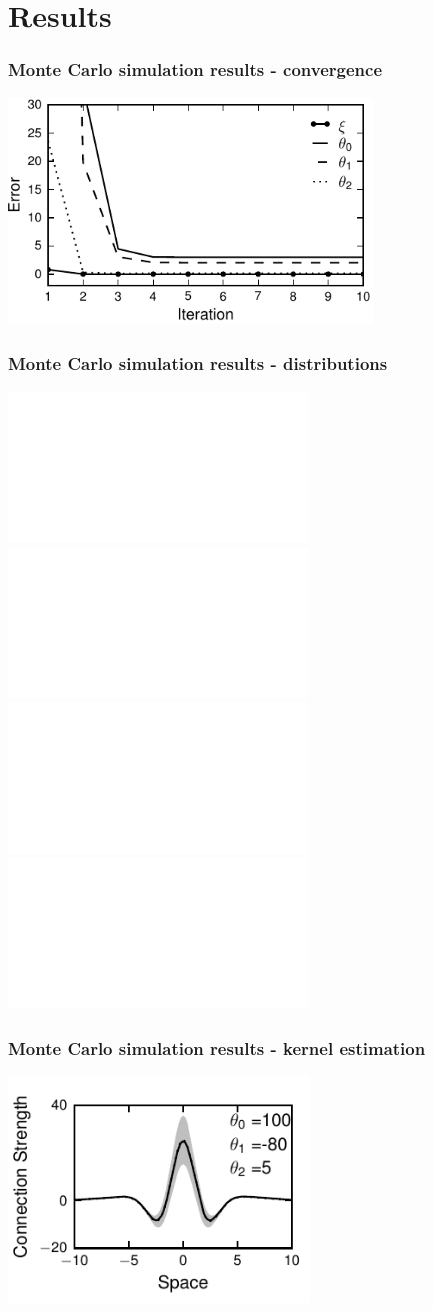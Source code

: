 \documentclass[compress]{beamer}
\begin{document}
\section[Results]{Results}
\begin{frame}\frametitle{Monte Carlo simulation results - convergence}
	\begin{center}
		\includegraphics[height=6cm]{./Figures/fig6.pdf}
	\end{center}
\end{frame}

\begin{frame}\frametitle{Monte Carlo simulation results - distributions}
	\begin{center}
		\includegraphics<1>[height=4cm]{./Figures/Figure7a.pdf}
		\includegraphics<1>[height=4cm]{./Figures/Figure7b.pdf}\\
		\includegraphics<1>[height=4cm]{./Figures/Figure7c.pdf}
		\includegraphics<1>[height=4cm]{./Figures/Figure7d.pdf}
	\end{center}	
\end{frame}

\begin{frame}\frametitle{Monte Carlo simulation results - kernel estimation}
	\begin{center}
		\includegraphics[height=6cm]{./Figures/Figure10a.pdf}
	\end{center}	
\end{frame}
\end{document}
